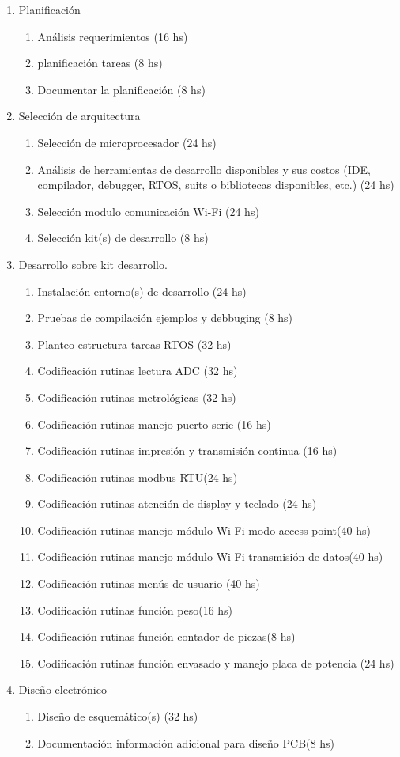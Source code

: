 \documentclass[11pt]{charter}
\begin{document}
\begin{enumerate}
\item Planificación
	\begin{enumerate}
	\item Análisis requerimientos (16 hs)
	\item planificación tareas (8 hs)
	\item Documentar la planificación (8 hs)
	\end{enumerate}
\item Selección de arquitectura
	\begin{enumerate}
	\item Selección de microprocesador (24 hs)
	\item Análisis de herramientas de desarrollo disponibles y sus costos (IDE, compilador, debugger, RTOS, suits o bibliotecas disponibles, etc.) (24 hs)
	\item Selección modulo comunicación Wi-Fi (24 hs)
	\item Selección kit(s) de desarrollo (8 hs)
	\end{enumerate}
\item Desarrollo sobre kit desarrollo.
	\begin{enumerate}
	\item Instalación entorno(s) de desarrollo (24 hs)
	\item Pruebas de compilación ejemplos y debbuging (8 hs)
	\item Planteo estructura tareas RTOS	(32 hs)
	\item Codificación rutinas lectura ADC (32 hs)
	\item Codificación rutinas metrológicas (32 hs)
	\item Codificación rutinas manejo puerto serie (16 hs)
	\item Codificación rutinas impresión y transmisión continua (16 hs)
	\item Codificación rutinas modbus RTU(24 hs)
	\item Codificación rutinas atención de display y teclado (24 hs)
	\item Codificación rutinas manejo módulo Wi-Fi modo access point(40 hs)
	\item Codificación rutinas manejo módulo Wi-Fi transmisión de datos(40 hs)
	\item Codificación rutinas menús de usuario (40 hs)
	\item Codificación rutinas función peso(16 hs)
	\item Codificación rutinas función contador de piezas(8 hs)
	\item Codificación rutinas función envasado y manejo placa de potencia (24 hs)
	\end{enumerate}
\item Diseño electrónico
	\begin{enumerate}
	\item Diseño de esquemático(s) (32 hs)
	\item Documentación información adicional para diseño PCB(8 hs)
	\end{enumerate}	


\end{enumerate}
\end{document}
